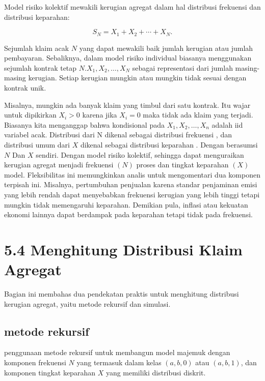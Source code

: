 \documentclass[
]{book}
\begin{document}
Model risiko kolektif mewakili kerugian agregat dalam hal distribusi frekuensi dan distribusi keparahan:

\[S_N=X_1 +X_2 + \cdots + X_N .\]

Sejumlah klaim acak \(N\) yang dapat mewakili baik jumlah kerugian atau jumlah pembayaran. Sebaliknya, dalam model risiko individual biasanya menggunakan sejumlah kontrak tetap \(N\).\(X_1, X_2, \ldots, X_N\) sebagai representasi dari jumlah masing-masing kerugian. Setiap kerugian mungkin atau mungkin tidak sesuai dengan kontrak unik.

Misalnya, mungkin ada banyak klaim yang timbul dari satu kontrak. Itu wajar untuk dipikirkan \(X_i>0\) karena jika \(X_i=0\) maka tidak ada klaim yang terjadi. Biasanya kita menganggap bahwa kondisional pada \(X_{1},X_{2},\ldots ,X_{n}\) adalah iid variabel acak. Distribusi dari N dikenal sebagai distribusi frekuensi , dan distribusi umum dari \(X\) dikenal sebagai distribusi keparahan . Dengan berasumsi \(N\) Dan \(X\) sendiri. Dengan model risiko kolektif, sehingga dapat menguraikan kerugian agregat menjadi frekuensi \(( N )\) proses dan tingkat keparahan \(( X )\) model. Fleksibilitas ini memungkinkan analis untuk mengomentari dua komponen terpisah ini. Misalnya, pertumbuhan penjualan karena standar penjaminan emisi yang lebih rendah dapat menyebabkan frekuensi kerugian yang lebih tinggi tetapi mungkin tidak memengaruhi keparahan. Demikian pula, inflasi atau kekuatan ekonomi lainnya dapat berdampak pada keparahan tetapi tidak pada frekuensi.

\hypertarget{menghitung-distribusi-klaim-agregat}{%
\chapter{5.4 Menghitung Distribusi Klaim Agregat}\label{menghitung-distribusi-klaim-agregat}}

Bagian ini membahas dua pendekatan praktis untuk menghitung distribusi kerugian agregat, yaitu metode rekursif dan simulasi.

\hypertarget{metode-rekursif}{%
\section{metode rekursif}\label{metode-rekursif}}

penggunaan metode rekursif untuk membangun model majemuk dengan komponen frekuensi \(N\) yang termasuk dalam kelas \((a,b,0)\) atau \((a,b,1)\), dan komponen tingkat keparahan \(X\) yang memiliki distribusi diskrit.
\end{document}
